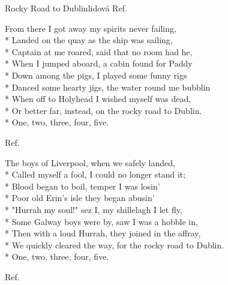 \documentclass[10.5pt]{book}
\begin{document}
\begin{poem}{Rocky Road to Dublin}{lidová}
Ref.

From there I got away my spirits never failing,\\*
Landed on the quay as the ship was sailing,\\*
Captain at me roared, said that no room had he,\\*
When I jumped aboard, a cabin found for Paddy\\*
Down among the pigs, I played some funny rigs\\*
Danced some hearty jigs, the water round me \mbox{bubblin}\\*
When off to Holyhead I wished myself was dead,\\*
Or better far, instead, on the rocky road to Dublin.\\*
One, two, three, four, five. 

Ref.

The boys of Liverpool, when we safely landed,\\*
Called myself a fool, I could no longer stand it;\\*
Blood began to boil, temper I was losin'\\*
Poor old Erin's isle they began abusin'\\*
"Hurrah my soul!" sez I, my shillelagh I let fly,\\*
Some Galway boys were by, saw I was a hobble in,\\*
Then with a loud Hurrah, they joined in the affray,\\*
We quickly cleared the way, for the rocky road to Dublin.\\*
One, two, three, four, five. 

Ref.

\end{poem}
\end{document}
